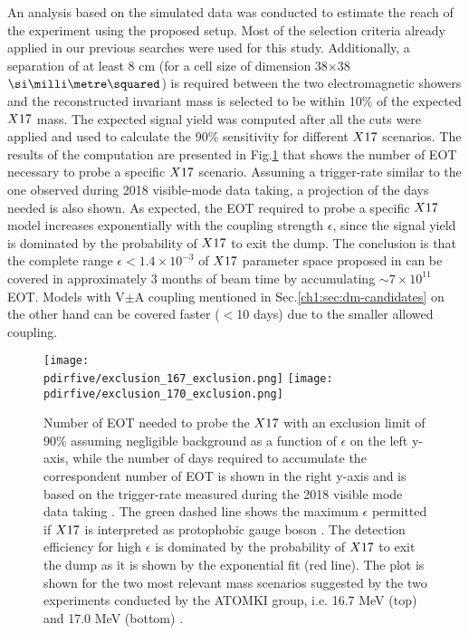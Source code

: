 An analysis based on the simulated data was conducted to estimate the reach of the experiment using the proposed setup. Most of the selection criteria already applied in our previous searches were used for this study. Additionally, a separation of at least 8 cm (for a cell size of dimension 38$\times$38 $\mms$) is required between the two electromagnetic showers and the reconstructed invariant mass is selected to be within 10\% of the expected $X17$ mass. The expected signal yield was computed after all the cuts were applied and used to calculate the 90\% sensitivity for different $X17$ scenarios. The results of the computation are presented in Fig.\ref{fig:exclusion-x17} that shows the number of EOT necessary to probe a specific $X17$ scenario. Assuming a trigger-rate similar to the one observed during 2018 visible-mode data taking, a projection of the days needed is also shown. As expected, the EOT required to probe a specific $X17$ model increases exponentially with the coupling strength $\epsilon$, since the signal yield is dominated by the probability of $X17$ to exit the dump. The conclusion is that the complete range $\epsilon < 1.4 \times 10^{-3}$ of $X17$ parameter space proposed in \cite{PhysRevD.95.035017} can be covered in approximately 3 months of beam time by accumulating $\sim 7 \times 10^{11}$ EOT. Models with V$\pm$A coupling mentioned in Sec.\ref{ch1:sec:dm-candidates} on the other hand can be covered faster ($<$10 days) due to the smaller allowed coupling. 

\begin{figure}[htb!]
  \centering
  \texttt{[image: \\pdirfive/exclusion\_167\_exclusion.png]}
  \texttt{[image: \\pdirfive/exclusion\_170\_exclusion.png]}
  \caption[EOT to X17 exclusion]{Number of EOT needed to probe the $X17$ with an exclusion limit of 90\% assuming negligible background as a function of $\epsilon$ on the left y-axis, while the number of days required to accumulate the correspondent number of EOT is shown in the right y-axis and is based on the trigger-rate measured during the 2018 visible mode data taking \cite{Banerjee:2019hmi}. The green dashed line shows the maximum $\epsilon$ permitted if $X17$ is interpreted as protophobic gauge boson \cite{PhysRevD.95.035017}. The detection efficiency for high $\epsilon$ is dominated by the probability of $X17$ to exit the dump as it is shown by the exponential fit (red line). The plot is shown for the two most relevant mass scenarios suggested by the two experiments conducted by the ATOMKI group, i.e. 16.7 MeV (top) and 17.0 MeV (bottom) \cite{Krasznahorkay:2015iga,Krasznahorkay:2019lyl}.}
  \label{fig:exclusion-x17}
\end{figure}
  

